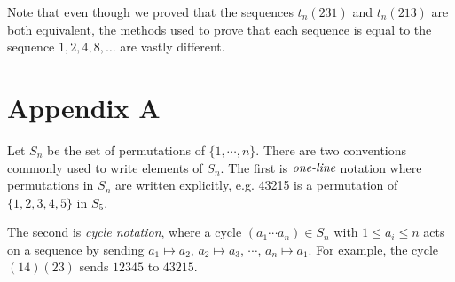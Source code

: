 \documentclass[11pt,letterpaper,twoside,english]{article}
\theoremstyle{theorem}
\theoremstyle{remark}
\begin{document}
Note that even though we proved that the sequences $t_n(231)$ and $t_n(213)$ are both equivalent, the methods used to prove that each sequence is equal to the sequence $1, 2, 4, 8, \ldots$ are vastly different.


\section{Appendix A}

Let $S_n$ be the set of permutations of $\{1,\cdots, n\}$. There are two conventions commonly used to write elements of $S_n$. The first is $\emph{one-line}$ notation where permutations in $S_n$ are written explicitly, e.g. 43215 is a permutation of $\{1,2,3,4,5\}$ in $S_5$. 

The second is \emph{cycle notation}, where a cycle $(a_1\cdots a_n)\in S_n$ with $1\le a_i\le n$ acts on a sequence by sending $a_1\mapsto a_2$, $a_2\mapsto a_3$, $\cdots$, $a_n\mapsto a_1$. For example, the cycle $(14)(23)$ sends $12345$ to $43215$. 
\end{document}
